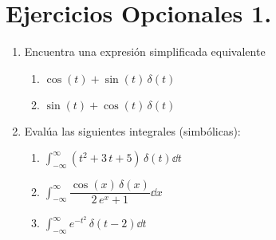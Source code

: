 \section{Ejercicios Opcionales 1.}
\begin{enumerate}
\item Encuentra una expresión simplificada equivalente 
\begin{enumerate}
\item $\cos (t) + \sin (t) \, \delta(t)$
\item $\sin (t) + \cos (t) \, \delta(t)$
\end{enumerate}
\item Evalúa las siguientes integrales (simbólicas):
\begin{enumerate}
\item $\displaystyle\int_{-\infty}^{\infty} (t^{2} + 3 \, t + 5) \, \delta(t) \dd{t}$
\item $\displaystyle\int_{-\infty}^{\infty} \dfrac{\cos(x) \, \delta(x)}{2 \, e^{x} + 1} \dd{x}$
\item $\displaystyle\int_{-\infty}^{\infty} e^{-t^{2}}  \, \delta(t - 2) \dd{t}$
\end{enumerate}
\end{enumerate}

